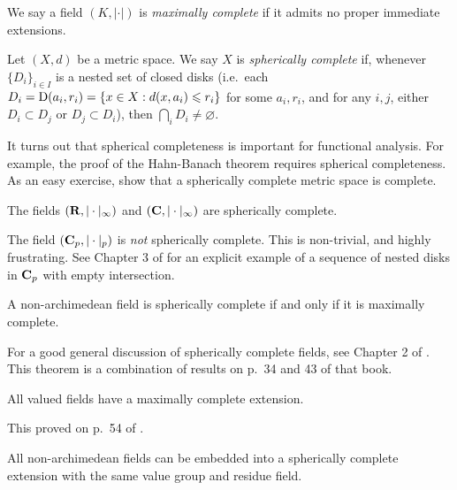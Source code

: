 \begin{definition}
We say a field $(K,|\cdot|)$ is \emph{maximally complete} if it admits no 
proper immediate extensions. 
\end{definition}

\begin{definition}
Let $(X,d)$ be a metric space. We say $X$ is \emph{spherically complete} if, 
whenever $\{D_i\}_{i\in I}$ is a nested set of closed disks (i.e.~each 
$D_i=\operatorname{D}(a_i,r_i)=\{x\in X:d(x,a_i)\leqslant r_i\}$ for some $a_i,r_i$, and 
for any $i,j$, either $D_i\subset D_j$ or $D_j\subset D_i$), then 
$\bigcap_i D_i\ne\varnothing$. 
\end{definition}

It turns out that spherical completeness is important for functional analysis. 
For example, the proof of the Hahn-Banach theorem requires spherical 
completeness. As an easy exercise, show that a spherically complete metric 
space is complete. 

\begin{example}
The fields $(\mathbf{R},|\cdot|_\infty)$ and $(\mathbf{C},|\cdot|_\infty)$ are spherically 
complete. 
\end{example}

\begin{example}
The field $(\mathbf{C}_p,|\cdot|_p)$ is \emph{not} spherically complete. This is 
non-trivial, and highly frustrating. See Chapter 3 of \cite{robert-2000} for an 
explicit example of a sequence of nested disks in $\mathbf{C}_p$ with empty 
intersection. 
\end{example}

\begin{theorem}
A non-archimedean field is spherically complete if and only if it is 
maximally complete. 
\end{theorem}

For a good general discussion of spherically complete fields, see Chapter 2 of 
\cite{narici-beckenstein-bachman}. This theorem is a combination of results on 
p.~34 and 43 of that book. 

\begin{theorem}[Krull]
All valued fields have a maximally complete extension. 
\end{theorem}

This proved on p.~54 of \cite{narici-beckenstein-bachman}. 

\begin{theorem}
All non-archimedean fields can be embedded into a spherically complete 
extension with the same value group and residue field. 
\end{theorem}

